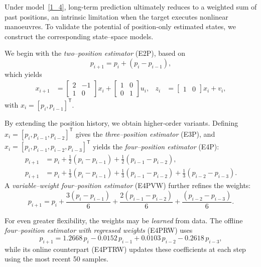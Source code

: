 \documentclass[sn-nature]{sn-jnl}%
\theoremstyle{thmstyleone}%
\theoremstyle{thmstyletwo}%
\theoremstyle{thmstylethree}%
\begin{document}
\noindent
Under model~\eqref{1_4}, long-term prediction ultimately reduces to a weighted sum of past positions, an intrinsic limitation when the target executes nonlinear manoeuvres.  To validate the potential of position‐only estimated states, we construct the corresponding state–space models.

We begin with the \emph{two–position estimator} (E2P), based on  
\[
p_{i+1}=p_i+(p_i-p_{i-1}),
\]
which yields
\begin{equation}
\label{eq:E2P}
\begin{aligned}
x_{i+1} &=
\begin{bmatrix}
2 & -1\\
1 &  0
\end{bmatrix}x_i +
\begin{bmatrix}
1&0\\[2pt]
0&1
\end{bmatrix}u_i, 
&
z_i &=
\begin{bmatrix}
1&0
\end{bmatrix}x_i + v_i,
\end{aligned}
\end{equation}
with \(x_i=[p_i,p_{i-1}]^{\mathsf T}\).

\medskip
By extending the position history, we obtain higher‐order variants.  Defining  
\(x_i=[p_i,p_{i-1},p_{i-2}]^{\mathsf T}\) gives the \emph{three–position estimator} (E3P),  
and \(x_i=[p_i,p_{i-1},p_{i-2},p_{i-3}]^{\mathsf T}\) yields the \emph{four–position estimator} (E4P):
\begin{equation}
\label{eq:E3P,E4P}
\begin{aligned}
p_{i+1}&=p_i+\tfrac12(p_i-p_{i-1})+\tfrac12(p_{i-1}-p_{i-2}),\\
p_{i+1}&=p_i+\tfrac13(p_i-p_{i-1})+\tfrac13(p_{i-1}-p_{i-2})
                     +\tfrac13(p_{i-2}-p_{i-3}).
\end{aligned}
\end{equation}
A \emph{variable–weight four–position estimator} (E4PVW) further refines the weights:
\begin{equation}
\label{eq:E4PVW}
p_{i+1}
= p_i
+ \frac{3(p_i-p_{i-1})}{6}
+ \frac{2(p_{i-1}-p_{i-2})}{6}
+ \frac{(p_{i-2}-p_{i-3})}{6}.
\end{equation}

\medskip
For even greater flexibility, the weights may be \emph{learned} from data.  The offline \emph{four–position estimator with regressed weights} (E4PRW) uses
\begin{equation}
\label{eq:E4PRW}
p_{i+1}
= 1.2668\,p_i
- 0.0152\,p_{i-1}
+ 0.0103\,p_{i-2}
- 0.2618\,p_{i-3},
\end{equation}
while its online counterpart (E4PTRW) updates these coefficients at each step using the most recent 50 samples.
\end{document}
